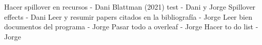 Hacer spillover en recursos - Dani
Blattman (2021) test - Dani y Jorge
Spillover effects - Dani
Leer y resumir papers citados en la bibliografía - Jorge
Leer bien documentos del programa - Jorge
Pasar todo a overleaf - Jorge
Hacer to do list - Jorge